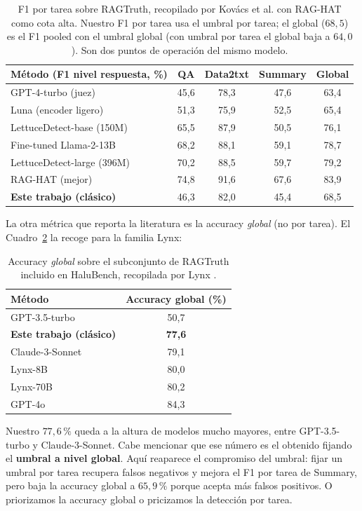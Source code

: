 \documentclass[12pt,a4paper]{report}
\theoremstyle{definition}
\begin{document}
\begin{table}[H]
\centering
\small
\begin{tabular}{lcccc}
\toprule
Método (F1 nivel respuesta, \%) & QA & Data2txt & Summary & Global \\
\midrule
GPT-4-turbo (juez) & 45,6 & 78,3 & 47,6 & 63,4 \\
Luna (encoder ligero) & 51,3 & 75,9 & 52,5 & 65,4 \\
LettuceDetect-base (150M) & 65,5 & 87,9 & 50,5 & 76,1 \\
Fine-tuned Llama-2-13B & 68,2 & 88,1 & 59,1 & 78,7 \\
LettuceDetect-large (396M) & 70,2 & 88,5 & 59,7 & 79,2 \\
RAG-HAT (mejor) & 74,8 & 91,6 & 67,6 & 83,9 \\
\midrule
\textbf{Este trabajo (clásico)} & 46,3 & 82,0 & 45,4 & 68,5 \\
\bottomrule
\end{tabular}
\caption{F1 por tarea sobre RAGTruth, recopilado por Kovács et al.
\cite{kovacs2025lettucedetect} con RAG-HAT \cite{song2024raghat} como cota alta. Nuestro F1
por tarea usa el umbral por tarea; el global ($68{,}5$) es el F1 pooled con el umbral global (con
umbral por tarea el global baja a $64{,}0$). Son dos puntos de operación del mismo modelo.}
\label{tab:lit}
\end{table}

La otra métrica que reporta la literatura es la accuracy \emph{global} (no por tarea). El
Cuadro~\ref{tab:acc} la recoge para la familia Lynx:

\begin{table}[H]
\centering
\small
\begin{tabular}{lc}
\toprule
Método & Accuracy global (\%) \\
\midrule
GPT-3.5-turbo & 50,7 \\
\textbf{Este trabajo (clásico)} & \textbf{77,6} \\
Claude-3-Sonnet & 79,1 \\
Lynx-8B & 80,0 \\
Lynx-70B & 80,2 \\
GPT-4o & 84,3 \\
\bottomrule
\end{tabular}
\caption{Accuracy \emph{global} sobre el subconjunto de RAGTruth incluido en HaluBench, recopilada
por Lynx \cite{ravi2024lynx}.}
\label{tab:acc}
\end{table}

Nuestro $77{,}6\,\%$ queda a la altura de
modelos mucho mayores, entre GPT-3.5-turbo y Claude-3-Sonnet. Cabe mencionar que ese número es el obtenido fijando el \textbf{umbral a nivel global}. Aquí reaparece el compromiso del umbral: fijar un
umbral por tarea recupera falsos negativos y mejora el F1 por tarea de Summary,
pero baja la accuracy global a $65{,}9\,\%$ porque acepta más falsos positivos. O priorizamos la accuracy global o pricizamos la detección por tarea.
\end{document}

